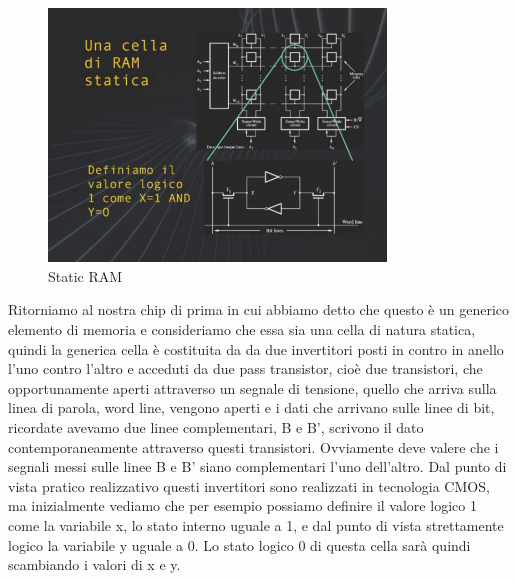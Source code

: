 \FloatBarrier
\begin{figure}[H]
  \centering
  \includegraphics[width=0.80\textwidth,
                    trim=40 40 10 40, %
                    clip]
                    {images/Lez04_p03_fig_03.png}
  \caption{Static RAM}
  \label{fig:Lez04_p03_fig_03}
\end{figure}
\FloatBarrier
\noindent

Ritorniamo al nostra chip di prima in cui abbiamo detto che questo è un generico elemento di memoria e consideriamo che essa sia una cella di natura statica, quindi la generica cella è costituita da da due invertitori posti in contro in anello l'uno contro l'altro e acceduti da due pass transistor, cioè due transistori, che opportunamente aperti attraverso un segnale di tensione, quello che arriva sulla linea di parola, word line, vengono aperti e i dati che arrivano sulle linee di bit, ricordate avevamo due linee complementari, B e B', scrivono il dato contemporaneamente attraverso questi transistori.
Ovviamente deve valere che i segnali messi sulle linee B e B' siano complementari l'uno dell'altro.
Dal punto di vista pratico realizzativo questi invertitori sono realizzati in tecnologia CMOS, ma inizialmente vediamo che per esempio possiamo definire il valore logico 1 come la variabile x, lo stato interno uguale a 1, e dal punto di vista strettamente logico la variabile y uguale a 0.
Lo stato logico 0 di questa cella sarà quindi scambiando i valori di x e y.

